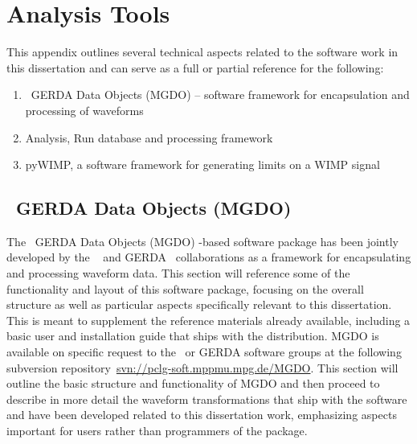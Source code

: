 

\chapter{Analysis Tools}
\label{app:MGDO}

This appendix outlines several technical aspects related to the software work in this dissertation and can serve as a full or partial reference for the following:

	\begin{enumerate}
		\item \MJ~GERDA Data Objects (MGDO) -- software framework for encapsulation and processing of waveforms
		\item Analysis, Run database and processing framework
		\item pyWIMP, a software framework for generating limits on a WIMP signal
	\end{enumerate}

	\section{\MJ~GERDA Data Objects (MGDO)}
	\label{sec:WaveformProcMGDO}
	
	
	The \MJ~GERDA Data Objects (MGDO) \cpp-based software package has been
jointly developed by the \MJ~\cite{MJCollaboration} and
GERDA~\cite{GERDACollaboration} collaborations as a framework for
encapsulating and processing waveform data.  This section will reference some
of the functionality and layout of this software package, focusing on the
overall structure as well as particular aspects specifically relevant to this
dissertation.  This is meant to supplement the reference materials already
available, including a basic user and installation guide that ships with the
distribution.  MGDO is available on specific request to the \MJ~or GERDA
software groups at the following subversion
repository~\url{svn://pclg-soft.mppmu.mpg.de/MGDO}.  This section will outline
the basic structure and functionality of MGDO and then proceed to describe in
more detail the waveform transformations that ship with the software and have been developed
related to this dissertation work,
emphasizing aspects important for users rather than programmers of the package.  

